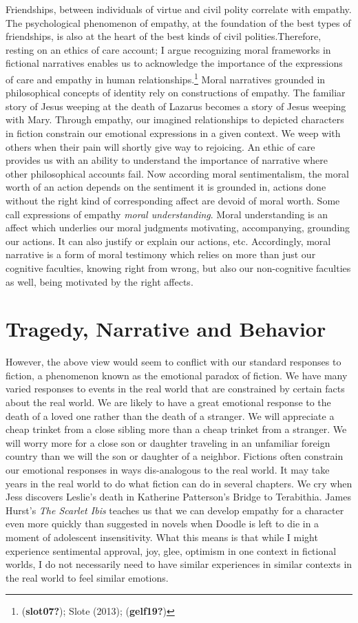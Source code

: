 \documentclass[12pt]{book}
\theoremstyle{definition}
\theoremstyle{remark}
\begin{document}
Friendships, between individuals of virtue and civil polity correlate with empathy. The psychological phenomenon of empathy, at the foundation of the best types of friendships, is also at the heart of the best kinds of civil polities.Therefore, resting on an ethics of care account; I argue recognizing moral frameworks in fictional narratives enables us to acknowledge the importance of the expressions of care and empathy in human relationships.\footnote{(\textbf{slot07?}); Slote (2013); (\textbf{gelf19?})} Moral narratives grounded in philosophical concepts of identity rely on constructions of empathy. The familiar story of Jesus weeping at the death of Lazarus becomes a story of Jesus weeping with Mary. Through empathy, our imagined relationships to depicted characters in fiction constrain our emotional expressions in a given context. We weep with others when their pain will shortly give way to rejoicing. An ethic of care provides us with an ability to understand the importance of narrative where other philosophical accounts fail. Now according moral sentimentalism, the moral worth of an action depends on the sentiment it is grounded in, actions done without the right kind of corresponding affect are devoid of moral worth. Some call expressions of empathy \emph{moral understanding}. Moral understanding is an affect which underlies our moral judgments motivating, accompanying, grounding our actions. It can also justify or explain our actions, etc. Accordingly, moral narrative is a form of moral testimony which relies on more than just our cognitive faculties, knowing right from wrong, but also our non-cognitive faculties as well, being motivated by the right affects.

\section{Tragedy, Narrative and Behavior}\label{tragedy-narrative-and-behavior}

However, the above view would seem to conflict with our standard responses to fiction, a phenomenon known as the emotional paradox of fiction. We have many varied responses to events in the real world that are constrained by certain facts about the real world. We are likely to have a great emotional response to the death of a loved one rather than the death of a stranger. We will appreciate a cheap trinket from a close sibling more than a cheap trinket from a stranger. We will worry more for a close son or daughter traveling in an unfamiliar foreign country than we will the son or daughter of a neighbor. Fictions often constrain our emotional responses in ways dis-analogous to the real world. It may take years in the real world to do what fiction can do in several chapters. We cry when Jess discovers Leslie's death in Katherine Patterson's Bridge to Terabithia. James Hurst's \emph{The Scarlet Ibis} teaches us that we can develop empathy for a character even more quickly than suggested in novels when Doodle is left to die in a moment of adolescent insensitivity. What this means is that while I might experience sentimental approval, joy, glee, optimism in one context in fictional worlds, I do not necessarily need to have similar experiences in similar contexts in the real world to feel similar emotions.
\end{document}
